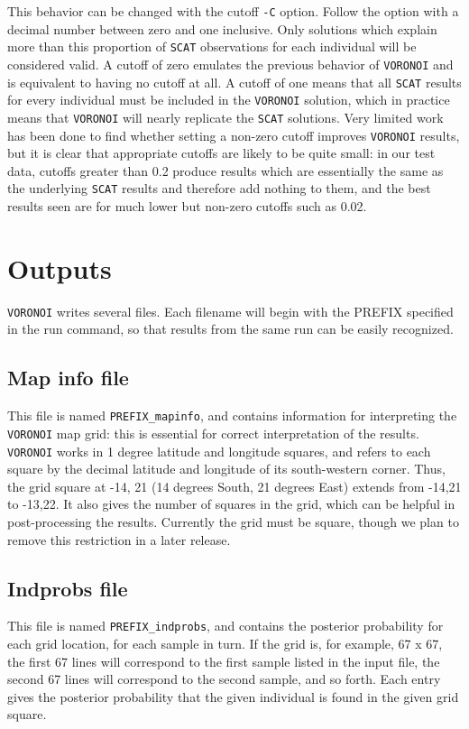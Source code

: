 \documentclass[10pt,titlepage,times,letterpaper]{article}
\def\SCAT{{\tt SCAT} }
\def\VORONOI{{\tt VORONOI} }
\begin{document}
This behavior can be changed with the cutoff {\tt -C} option.  Follow the option with
a decimal number between zero and one inclusive.  Only solutions which explain more
than this proportion of \SCAT observations for each individual will be considered valid.  
A cutoff
of zero emulates the previous behavior of \VORONOI and is equivalent to having no
cutoff at all.  A cutoff of one means that all \SCAT results for every individual must
be included in the \VORONOI solution, which in practice means that \VORONOI will nearly
replicate the \SCAT solutions.  Very limited
work has been done to find whether setting a non-zero cutoff improves \VORONOI results,
but it is clear that appropriate cutoffs are likely to be quite small:  in our test
data, cutoffs greater than 0.2 produce results which are essentially the same as 
the underlying \SCAT results and therefore add nothing to them, and the best results 
seen are for much lower but non-zero cutoffs such as 0.02.

\section{Outputs}

\VORONOI writes several files. Each filename will begin with the PREFIX
specified in the run command, so that results from the same run can be easily
recognized.


\subsection{Map info file}

This file is named {\tt PREFIX\_mapinfo}, and contains information for interpreting the
\VORONOI map grid:  this is essential for correct interpretation of the results.
\VORONOI works in 1 degree latitude and longitude squares, and refers to each
square by the decimal latitude and longitude of its south-western corner.  Thus,
the grid square at -14, 21 (14 degrees South, 21 degrees East) extends from -14,21
to -13,22.  It also gives the number of squares in the grid, which can be helpful
in post-processing the results.  Currently the grid must be square, though we plan
to remove this restriction in a later release.

\subsection{Indprobs file}

This file is named {\tt PREFIX\_indprobs}, and contains the posterior probability
for each grid location, for each sample in turn. If the grid is, for example, 67 x 67,
the first 67 lines will correspond to the first sample listed in the input file,
the second 67 lines will correspond to the second sample, and so forth.  Each entry
gives the posterior probability that the given individual is found in the given
grid square.
\end{document}
